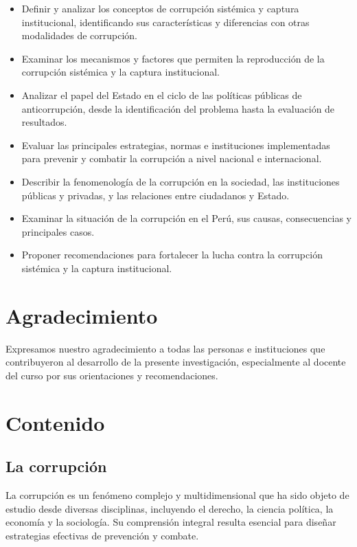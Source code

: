 \documentclass[12pt,a4paper]{article}
\begin{document}
\begin{itemize}
    \item Definir y analizar los conceptos de corrupción sistémica y captura institucional, identificando sus características y diferencias con otras modalidades de corrupción.
    \item Examinar los mecanismos y factores que permiten la reproducción de la corrupción sistémica y la captura institucional.
    \item Analizar el papel del Estado en el ciclo de las políticas públicas de anticorrupción, desde la identificación del problema hasta la evaluación de resultados.
    \item Evaluar las principales estrategias, normas e instituciones implementadas para prevenir y combatir la corrupción a nivel nacional e internacional.
    \item Describir la fenomenología de la corrupción en la sociedad, las instituciones públicas y privadas, y las relaciones entre ciudadanos y Estado.
    \item Examinar la situación de la corrupción en el Perú, sus causas, consecuencias y principales casos.
    \item Proponer recomendaciones para fortalecer la lucha contra la corrupción sistémica y la captura institucional.
\end{itemize}

\section*{Agradecimiento}

Expresamos nuestro agradecimiento a todas las personas e instituciones que contribuyeron al desarrollo de la presente investigación, especialmente al docente del curso por sus orientaciones y recomendaciones.

\section{Contenido}

\subsection{La corrupción}

La corrupción es un fenómeno complejo y multidimensional que ha sido objeto de estudio desde diversas disciplinas, incluyendo el derecho, la ciencia política, la economía y la sociología. Su comprensión integral resulta esencial para diseñar estrategias efectivas de prevención y combate.
\end{document}
